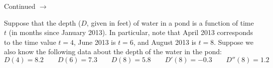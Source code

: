 \documentclass[addpoints]{exam}
\def\pageturn{\vfill
\begin{flushright}
	\begin{small}
		Continued $\rightarrow$
	\end{small}
\end{flushright}
\newpage}
\begin{document}
\begin{questions}
% 		
% 		
% 		
% 		
% 		
% 		
% 		

\pageturn

\question Suppose that the depth ($D$, given in feet) of water in a pond is a function of time $t$ (in months since January 2013). In particular, note that April 2013 corresponds to the time value $t = 4$, June 2013 is $t = 6$, and August 2013 is $t=8$. Suppose we also know the following data about the depth of the water in the pond: 
\[ D(4) = 8.2 \qquad D(6) = 7.3 \qquad D(8) = 5.8 \qquad D'(8) = -0.3 \qquad D''(8) = 1.2 \]
\end{questions}
\end{document}
